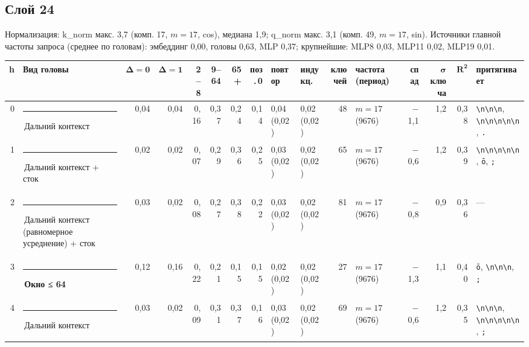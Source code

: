 \documentclass[10pt]{article}
\begin{document}
\noindent\begin{minipage}{\linewidth}
\subsection*{Слой 24}
{\small\color{ink2} Нормализация: k\_norm макс. 3,7 (комп. 17, $m{=}17$, cos), медиана 1,9; q\_norm макс. 3,1 (комп. 49, $m{=}17$, sin). Источники главной частоты запроса (среднее по головам): эмбеддинг 0,00, головы 0,63, MLP 0,37; крупнейшие: MLP8 0,03, MLP11 0,02, MLP19 0,01.}
\begin{center}{\footnotesize\begin{tabular}{|r|l|r|r|r|r|r|r|l|l|r|l|r|r|r|l|}
\hline
\rowcolor{head}\textbf{h} & \textbf{Вид головы} & $\boldsymbol{\Delta{=}0}$ & $\boldsymbol{\Delta{=}1}$ & \textbf{2–8} & \textbf{9–64} & \textbf{65+} & \textbf{поз.\,0} & \textbf{повтор} & \textbf{индукц.} & \textbf{ключей} & \textbf{частота (период)} & \textbf{спад} & $\boldsymbol{\sigma}$ \textbf{ключа} & $\boldsymbol{R^2}$ & \textbf{притягивает} \\ \hline
0 & \textcolor[HTML]{C3C2B7}{\rule{0.62em}{0.62em}}\,Дальний контекст & 0,04 & 0,04 & 0,16 & 0,37 & 0,24 & 0,14 & 0,04 (0,02) & 0,02 (0,02) & 48 & $m{=}17$ (9676) & $-$1,1 & 1,2 & 0,38 & \texttt{\textvisiblespace{}\textbackslash{}n\textbackslash{}n\textbackslash{}n}, \texttt{\textbackslash{}n\textbackslash{}n\textbackslash{}n\textbackslash{}n\textbackslash{}n}, \texttt{\textvisiblespace{}.} \\ \hline
1 & \textcolor[HTML]{C3C2B7}{\rule{0.62em}{0.62em}}\,Дальний контекст + сток & 0,02 & 0,02 & 0,07 & 0,29 & 0,36 & 0,25 & 0,03 (0,02) & 0,02 (0,02) & 65 & $m{=}17$ (9676) & $-$0,6 & 1,2 & 0,39 & \texttt{\textbackslash{}n\textbackslash{}n\textbackslash{}n\textbackslash{}n\textbackslash{}n}, \texttt{ō}, \texttt{\textvisiblespace{};} \\ \hline
2 & \textcolor[HTML]{C3C2B7}{\rule{0.62em}{0.62em}}\,Дальний контекст (равномерное усреднение) + сток & 0,03 & 0,02 & 0,08 & 0,27 & 0,38 & 0,22 & 0,03 (0,02) & 0,02 (0,02) & 81 & $m{=}17$ (9676) & $-$0,8 & 0,9 & 0,36 & — \\ \hline
3 & \textcolor[HTML]{EDA100}{\rule{0.62em}{0.62em}}\,\textbf{Окно ≤ 64} & 0,12 & 0,16 & 0,22 & 0,21 & 0,15 & 0,15 & 0,02 (0,02) & 0,02 (0,02) & 27 & $m{=}17$ (9676) & $-$1,3 & 1,1 & 0,40 & \texttt{ō}, \texttt{\textvisiblespace{}\textbackslash{}n\textbackslash{}n\textbackslash{}n}, \texttt{\textvisiblespace{};} \\ \hline
4 & \textcolor[HTML]{C3C2B7}{\rule{0.62em}{0.62em}}\,Дальний контекст & 0,03 & 0,02 & 0,09 & 0,31 & 0,37 & 0,16 & 0,03 (0,02) & 0,02 (0,02) & 69 & $m{=}17$ (9676) & $-$0,6 & 1,2 & 0,35 & \texttt{\textvisiblespace{}\textbackslash{}n\textbackslash{}n\textbackslash{}n}, \texttt{\textbackslash{}n\textbackslash{}n\textbackslash{}n\textbackslash{}n\textbackslash{}n}, \texttt{\textvisiblespace{};} \\ \hline

\end{tabular}}
\end{center}
\end{minipage}
\end{document}
